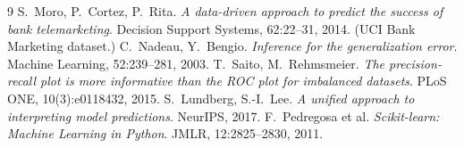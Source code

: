 \documentclass[11pt]{article}
\begin{document}
\begin{thebibliography}{9}
\small
{} S.~Moro, P.~Cortez, P.~Rita. \emph{A data-driven approach to predict the success of bank
telemarketing}. Decision Support Systems, 62:22--31, 2014. (UCI Bank Marketing dataset.)
 C.~Nadeau, Y.~Bengio. \emph{Inference for the generalization error}. Machine Learning,
52:239--281, 2003.
 T.~Saito, M.~Rehmsmeier. \emph{The precision-recall plot is more informative than the
ROC plot for imbalanced datasets}. PLoS ONE, 10(3):e0118432, 2015.
 S.~Lundberg, S.-I.~Lee. \emph{A unified approach to interpreting model predictions}.
NeurIPS, 2017.
 F.~Pedregosa et al. \emph{Scikit-learn: Machine Learning in Python}. JMLR,
12:2825--2830, 2011.
\end{thebibliography}
\end{document}
